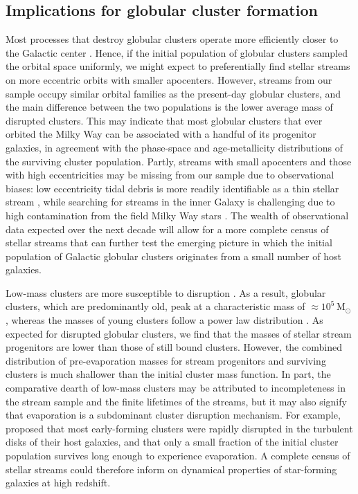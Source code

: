 \documentclass[twocolumn]{aastex63}
\newcommand{\msun}{\ensuremath{\textrm{M}_\odot}}
\begin{document}
\subsection{Implications for globular cluster formation}
\label{sec:discuss_gcform}
Most processes that destroy globular clusters operate more efficiently closer to the Galactic center \citep[e.g.,][]{gnedin:1997}.
Hence, if the initial population of globular clusters sampled the orbital space uniformly, we might expect to preferentially find stellar streams on more eccentric orbits with smaller apocenters.
However, streams from our sample occupy similar orbital families as the present-day globular clusters, and the main difference between the two populations is the lower average mass of disrupted clusters.
This may indicate that most globular clusters that ever orbited the Milky Way can be associated with a handful of its progenitor galaxies, in agreement with the phase-space \citep{massari:2019} and age-metallicity \citep{kruijssen19e,kruijssen20} distributions of the surviving cluster population.
Partly, streams with small apocenters and those with high eccentricities may be missing from our sample due to observational biases: low eccentricity tidal debris is more readily identifiable as a thin stellar stream \citep{hendel:2015}, while searching for streams in the inner Galaxy is challenging due to high contamination from the field Milky Way stars \citep[e.g.,][]{ibata:2019}.
The wealth of observational data expected over the next decade will allow for a more complete census of stellar streams that can further test the emerging picture in which the initial population of Galactic globular clusters originates from a small number of host galaxies.

Low-mass clusters are more susceptible to disruption \citep[e.g.,][]{fall:2001,kruijssen15b}.
As a result, globular clusters, which are predominantly old, peak at a characteristic mass of $\approx10^5\,\msun$ \citep[e.g.,][]{harris:1991}, whereas the masses of young clusters follow a power law distribution \citep[e.g.,][]{zhang:1999}.
As expected for disrupted globular clusters, we find that the masses of stellar stream progenitors are lower than those of still bound clusters.
However, the combined distribution of pre-evaporation masses for stream progenitors and surviving clusters is much shallower than the initial cluster mass function.
In part, the comparative dearth of low-mass clusters may be attributed to incompleteness in the stream sample and the finite lifetimes of the streams, but it may also signify that evaporation is a subdominant cluster disruption mechanism.
For example, \citet{kruijssen15b} proposed that most early-forming clusters were rapidly disrupted in the turbulent disks of their host galaxies, and that only a small fraction of the initial cluster population survives long enough to experience evaporation.
A complete census of stellar streams could therefore inform on dynamical properties of star-forming galaxies at high redshift.
\end{document}
